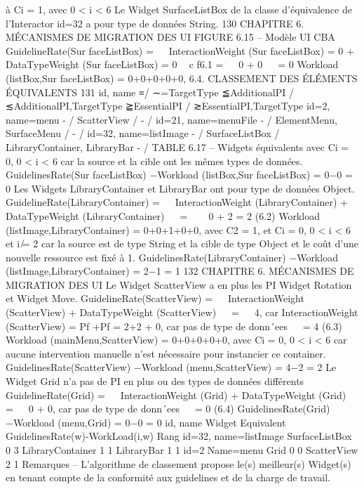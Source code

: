 \documentclass{article}
\begin{document}
\`{a} Ci = 1, avec 0 < i < 6
Le Widget SurfaceListBox de la classe d’\'{e}quivalence de l’Interactor id=32 a pour type de donn\'{e}es
String.
130
CHAPITRE 6. MÉCANISMES DE MIGRATION DES UI
FIGURE 6.15 – Mod\`{e}le UI CBA
GuidelineRate(Sur faceListBox) =


InteractionWeight (Sur faceListBox) = 0
+
DataTypeWeight (Sur faceListBox) = 0

c f6.1
=


0
+
0


= 0
Workload (listBox,Sur faceListBox) = 0+0+0+0+0,
6.4. CLASSEMENT DES ÉLÉMENTS ÉQUIVALENTS
131
id, name
≡/ ∼=TargetType
≦AdditionalPI
/ ≲AdditionalPI,TargetType
≧EssentialPI
/ ≳EssentialPI,TargetType
id=2, name=menu
- / ScatterView / - / id=21, name=menuFile
- / ElementMenu,
SurfaceMenu / - / id=32, name=listImage
- / SurfaceListBox /
LibraryContainer,
LibraryBar
- / TABLE 6.17 – Widgets \'{e}quivalents
avec Ci = 0, 0 < i < 6 car la source et la cible ont les m\^{e}mes types de donn\'{e}es.
GuidelinesRate(Sur faceListBox) −Workload (listBox,Sur faceListBox) = 0−0
= 0
Les Widgets LibraryContainer et LibraryBar ont pour type de donn\'{e}es Object.
GuidelineRate(LibraryContainer) =


InteractionWeight (LibraryContainer)
+
DataTypeWeight (LibraryContainer)


=



0
+
2
= 2
(6.2)
Workload (listImage,LibraryContainer) = 0+0+1+0+0,
avec C2 = 1, et Ci = 0, 0 < i < 6 et i ̸= 2 car la source est de type String et la cible de type Object et
le co\^{u}t d’une nouvelle ressource est ﬁx\'{e} \`{a} 1.
GuidelinesRate(LibraryContainer) −Workload (listImage,LibraryContainer) = 2−1
= 1
132
CHAPITRE 6. MÉCANISMES DE MIGRATION DES UI
Le Widget ScatterView a en plus les PI Widget Rotation et Widget Move.
GuidelineRate(ScatterView) =


InteractionWeight (ScatterView)
+
DataTypeWeight (ScatterView)


=


4, car InteractionWeight (ScatterView) = Pf +Pf = 2+2
+
0, car pas de type de donn´ees


= 4
(6.3)
Workload (mainMenu,ScatterView) = 0+0+0+0+0,
avec Ci = 0, 0 < i < 6 car aucune intervention manuelle n’est n\'{e}cessaire pour instancier ce container.
GuidelinesRate(ScatterView) −Workload (menu,ScatterView) = 4−2
= 2
Le Widget Grid n’a pas de PI en plus ou des types de donn\'{e}es diff\'{e}rents
GuidelineRate(Grid) =


InteractionWeight (Grid)
+
DataTypeWeight (Grid)


=


0
+
0, car pas de type de donn´ees


= 0
(6.4)
GuidelinesRate(Grid)−Workload (menu,Grid) = 0−0
= 0
id, name
Widget Equivalent
GuidelinesRate(w)-WorkLoad(i,w)
Rang
id=32, name=listImage
SurfaceListBox
0
3
LibraryContainer
1
1
LibraryBar
1
1
id=2 Name=menu
Grid
0
0
ScatterView
2
1
Remarques
– L’algorithme de classement propose le(s) meilleur(s) Widget(s) en tenant compte de la conformit\'{e} aux guidelines et de la charge de travail.
\end{document}
